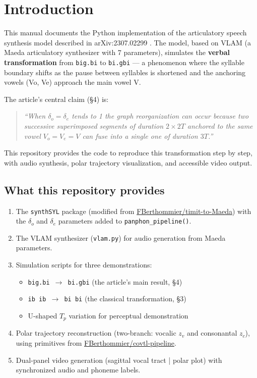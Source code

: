 \documentclass[11pt,a4paper]{article}
\begin{document}
\section{Introduction}

This manual documents the Python implementation of the articulatory
speech synthesis model described in arXiv:2307.02299
\cite{berthommier2023}. The model, based on VLAM (a Maeda
articulatory synthesizer with 7 parameters), simulates the
\textbf{verbal transformation} from \texttt{big.bi} to \texttt{bi.gbi}
--- a phenomenon where the syllable boundary shifts as the pause
between syllables is shortened and the anchoring vowels (Vo, Ve)
approach the main vowel V.

The article's central claim (\S4) is:
\begin{quote}
\itshape
``When $\delta_o = \delta_e$ tends to 1 the graph reorganization
can occur because two successive superimposed segments of duration
$2 \times 2T$ anchored to the same vowel $V_o = V_e = V$ can fuse
into a single one of duration $3T$.''
\end{quote}

This repository provides the code to reproduce this transformation
step by step, with audio synthesis, polar trajectory visualization,
and accessible video output.

\subsection{What this repository provides}

\begin{enumerate}[leftmargin=1.4em]
\item The \texttt{synthSYL} package (modified from
\href{https://github.com/FBerthommier/timit-to-Maeda}{FBerthommier/timit-to-Maeda})
with the $\delta_o$ and $\delta_e$ parameters added to
\texttt{panphon\_pipeline()}.

\item The VLAM synthesizer (\texttt{vlam.py}) for audio generation
from Maeda parameters.

\item Simulation scripts for three demonstrations:
  \begin{itemize}
  \item \texttt{big.bi $\to$ bi.gbi} (the article's main result, \S4)
  \item \texttt{ib ib $\to$ bi bi} (the classical transformation, \S3)
  \item U-shaped $T_p$ variation for perceptual demonstration
  \end{itemize}

\item Polar trajectory reconstruction (two-branch: vocalic $z_v$
and consonantal $z_c$), using primitives from
\href{https://github.com/FBerthommier/covtl-pipeline}{FBerthommier/covtl-pipeline}.

\item Dual-panel video generation (sagittal vocal tract | polar plot)
with synchronized audio and phoneme labels.
\end{enumerate}
\end{document}
